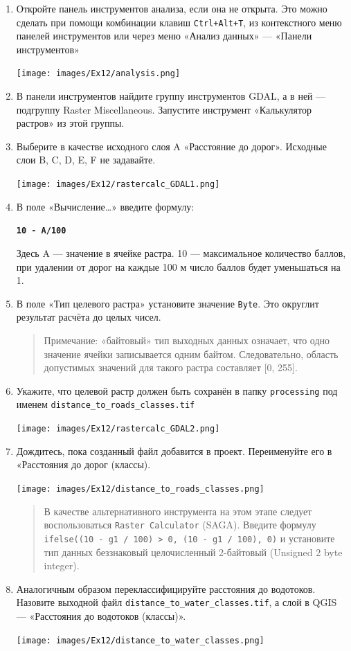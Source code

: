 \documentclass[
  12pt,
]{book}
\begin{document}
\begin{enumerate}
\def\labelenumi{\arabic{enumi}.}
\item
  Откройте панель инструментов анализа, если она не открыта. Это можно сделать при помощи комбинации клавиш \texttt{Ctrl+Alt+T}, из контекстного меню панелей инструментов или через меню «Анализ данных» --- «Панели инструментов»

  \texttt{[image: images/Ex12/analysis.png]}
\item
  В панели инструментов найдите группу инструментов GDAL, а в ней --- подгруппу Raster Miscellaneous. Запустите инструмент «Калькулятор растров» из этой группы.
\item
  Выберите в качестве исходного слоя A «Расстояние до дорог». Исходные слои B, C, D, E, F не задавайте.

  \texttt{[image: images/Ex12/rastercalc\_GDAL1.png]}
\item
  В поле «Вычисление\ldots» введите формулу:

  \textbf{\texttt{10\ -\ A/100}}

  Здесь A --- значение в ячейке растра. 10 --- максимальное количество баллов, при удалении от дорог на каждые 100 м число баллов будет уменьшаться на 1.
\item
  В поле «Тип целевого растра» установите значение \texttt{Byte}. Это округлит результат расчёта до целых чисел.

  \begin{quote}
  Примечание: «байтовый» тип выходных данных означает, что одно значение ячейки записывается одним байтом. Следовательно, область допустимых значений для такого растра составляет {[}0, 255{]}.
  \end{quote}
\item
  Укажите, что целевой растр должен быть сохранён в папку \texttt{processing} под именем \texttt{distance\_to\_roads\_classes.tif}

  \texttt{[image: images/Ex12/rastercalc\_GDAL2.png]}
\item
  Дождитесь, пока созданный файл добавится в проект. Переименуйте его в «Расстояния до дорог (классы).

  \texttt{[image: images/Ex12/distance\_to\_roads\_classes.png]}

  \begin{quote}
  В качестве альтернативного инструмента на этом этапе следует воспользоваться \texttt{Raster\ Calculator} (SAGA). Введите формулу \texttt{ifelse((10\ -\ g1\ /\ 100)\ \textgreater{}\ 0,\ (10\ -\ g1\ /\ 100),\ 0)} и установите тип данных беззнаковый целочисленный 2-байтовый (Unsigned 2 byte integer).
  \end{quote}
\item
  Аналогичным образом переклассифицируйте расстояния до водотоков. Назовите выходной файл \texttt{distance\_to\_water\_classes.tif}, а слой в QGIS --- «Расстояния до водотоков (классы)».

  \texttt{[image: images/Ex12/distance\_to\_water\_classes.png]}
\end{enumerate}
\end{document}
